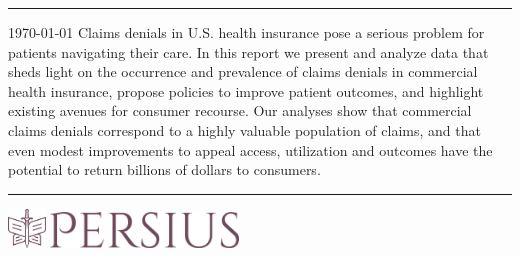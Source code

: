 \documentclass[12pt, a4paper,twoside,parskip=full]{report}
\theoremstyle{plain} %
\theoremstyle{definition} %
\theoremstyle{remark} %
\numberwithin{equation}{chapter}
\begin{document}
		
		
		\thispagestyle{empty} %
		
		\noindent
		\begin{minipage}{0.1\textwidth}
		\end{minipage}
		\hfill
		
		\begin{center}
			\noindent\textcolor{primaryc}{\rule{\linewidth}{4.8pt}}
			
			\vspace{2em}
			
			\vspace{3em}
			
			\vspace{3em}
			
			{\small \today }
			\vfill
			Claims denials in U.S. health insurance pose a serious problem for patients navigating their care. 
			In this report we present and analyze data that sheds light on the occurrence and prevalence of claims 
			denials in commercial health insurance, propose policies to improve patient outcomes, and highlight 
			existing avenues for consumer recourse. Our analyses show that commercial claims denials correspond 
			to a highly valuable population of claims, and that even modest improvements to appeal access, utilization 
			and outcomes have the potential to return billions of dollars to consumers.
			\vfill
			

			
			\vspace{0.5em}
			\noindent\textcolor{primaryc}{\rule{\linewidth}{4.8pt}}
			

			
			\vspace{3em}
			\includegraphics[width = 10mm]{images/persius/favicon.png}
			\hspace{2mm}
			\includegraphics[width = 50mm]{images/persius/persius_f1_maroon.png}\\[8ex]
		\end{center}
		
		\clearpage
		
\end{document}
